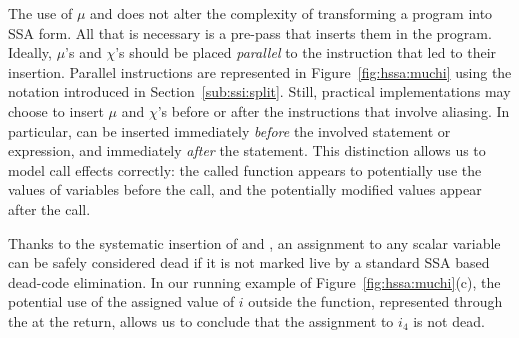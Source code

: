 The use of $\mu$ and \chiops does not alter the complexity of transforming a program into SSA form. All that is necessary is a pre-pass that inserts them in the program. Ideally, $\mu$'s and $\chi$'s should be placed \emph{parallel} to the instruction that led to their insertion. Parallel instructions are represented in Figure~\ref{fig:hssa:muchi} using the notation introduced in Section~\ref{sub:ssi:split}. Still, practical implementations may choose to insert $\mu$ and $\chi$'s before or after the instructions that involve aliasing. In particular, \mufuns can be inserted immediately {\em before} the involved statement or expression, and \chiops immediately {\em after} the statement. This distinction allows us to model call effects correctly: the called function appears to potentially use the values of variables before the call, and the potentially modified values appear after the call.

Thanks to the systematic insertion of \mufuns and \chifuns, an assignment to any scalar variable can be safely considered dead if it is not marked live by a standard SSA based dead-code elimination. In our running example of Figure~\ref{fig:hssa:muchi}(c), the potential use of the assigned value of $i$ outside the
function, represented through the \mufun at the return, allows us to conclude
that the assignment to $i_4$ is not dead.


